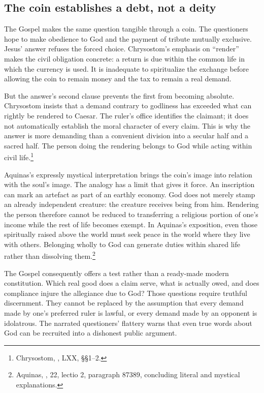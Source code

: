 \subsection{The coin establishes a debt, not a deity}
The Gospel makes the same question tangible through a coin. The questioners hope to make obedience to God and the payment of tribute mutually exclusive. Jesus' answer refuses the forced choice. Chrysostom's emphasis on ``render'' makes the civil obligation concrete: a return is due within the common life in which the currency is used. It is inadequate to spiritualize the exchange before allowing the coin to remain money and the tax to remain a real demand.

But the answer's second clause prevents the first from becoming absolute. Chrysostom insists that a demand contrary to godliness has exceeded what can rightly be rendered to Caesar. The ruler's office identifies the claimant; it does not automatically establish the moral character of every claim. This is why the answer is more demanding than a convenient division into a secular half and a sacred half. The person doing the rendering belongs to God while acting within civil life.\footnote{Chrysostom, , LXX, §§1--2.}

Aquinas's expressly mystical interpretation brings the coin's image into relation with the soul's image. The analogy has a limit that gives it force. An inscription can mark an artefact as part of an earthly economy. God does not merely stamp an already independent creature: the creature receives being from him. Rendering the person therefore cannot be reduced to transferring a religious portion of one's income while the rest of life becomes exempt. In Aquinas's exposition, even those spiritually raised above the world must seek peace in the world where they live with others. Belonging wholly to God can generate duties within shared life rather than dissolving them.\footnote{Aquinas, , 22, lectio 2, paragraph 87389, concluding literal and mystical explanations.}

The Gospel consequently offers a test rather than a ready-made modern constitution. Which real good does a claim serve, what is actually owed, and does compliance injure the allegiance due to God? Those questions require truthful discernment. They cannot be replaced by the assumption that every demand made by one's preferred ruler is lawful, or every demand made by an opponent is idolatrous. The narrated questioners' flattery warns that even true words about God can be recruited into a dishonest public argument.

